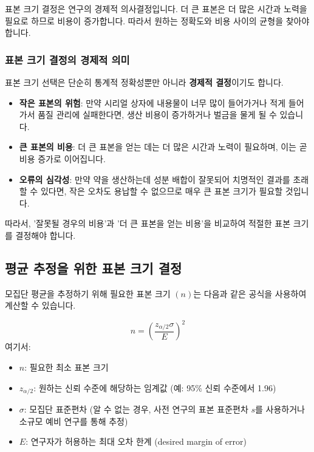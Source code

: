 \documentclass[11pt,a4paper]{article}
\theoremstyle{definition}
\begin{document}
\begin{enumerate}
\begin{enumerate}
\begin{tipbox}
    표본 크기 결정은 연구의 경제적 의사결정입니다. 더 큰 표본은 더 많은 시간과 노력을 필요로 하므로 비용이 증가합니다. 따라서 원하는 정확도와 비용 사이의 균형을 찾아야 합니다.
\end{tipbox}

\subsubsection*{표본 크기 결정의 경제적 의미}
표본 크기 선택은 단순히 통계적 정확성뿐만 아니라 \textbf{경제적 결정}이기도 합니다.
\begin{itemize}
    \item \textbf{작은 표본의 위험}: 만약 시리얼 상자에 내용물이 너무 많이 들어가거나 적게 들어가서 품질 관리에 실패한다면, 생산 비용이 증가하거나 벌금을 물게 될 수 있습니다.
    \item \textbf{큰 표본의 비용}: 더 큰 표본을 얻는 데는 더 많은 시간과 노력이 필요하며, 이는 곧 비용 증가로 이어집니다.
    \item \textbf{오류의 심각성}: 만약 약을 생산하는데 성분 배합이 잘못되어 치명적인 결과를 초래할 수 있다면, 작은 오차도 용납할 수 없으므로 매우 큰 표본 크기가 필요할 것입니다.
\end{itemize}
따라서, '잘못될 경우의 비용'과 '더 큰 표본을 얻는 비용'을 비교하여 적절한 표본 크기를 결정해야 합니다.

\subsection{평균 추정을 위한 표본 크기 결정}
모집단 평균을 추정하기 위해 필요한 표본 크기 \((n)\)는 다음과 같은 공식을 사용하여 계산할 수 있습니다.

\begin{equation*}
    n = \left( \frac{z_{\alpha/2} \sigma}{E} \right)^2
\end{equation*}
여기서:
\begin{itemize}
    \item \(n\): 필요한 최소 표본 크기
    \item \(z_{\alpha/2}\): 원하는 신뢰 수준에 해당하는 임계값 (예: 95\% 신뢰 수준에서 1.96)
    \item \(\sigma\): 모집단 표준편차 (알 수 없는 경우, 사전 연구의 표본 표준편차 \(s\)를 사용하거나 소규모 예비 연구를 통해 추정)
    \item \(E\): 연구자가 허용하는 최대 오차 한계 (desired margin of error)
\end{itemize}


\end{enumerate}
\end{enumerate}
\end{document}
